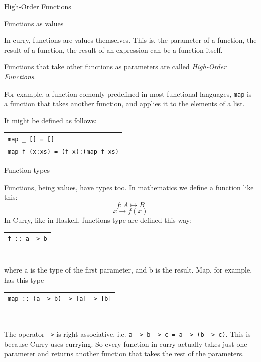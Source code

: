 \documentclass{beamer}
\newcommand{\q}[1]{\texttt{#1}}
\begin{document}
\begin{section}{High-Order Functions}
    \begin{subsection}{Functions as values}
      \begin{frame}
        In curry, functions are values themselves. This is, the parameter of a
        function, the result of a function, the result of an expression can be a
        function itself.
    
        Functions that take other functions as parameters are called
        \textit{High-Order Functions}.

        For example, a function comonly predefined in most functional languages,
        \q{map} is a function that takes another function, and applies it to the
        elements of a list.

        It might be defined as follows:
        \begin{tabular}[c]{l}
        \\
        \q{map \_ [] = []}\\
        \q{map f (x:xs) = (f x):(map f xs)}\\
        
        \end{tabular}
      \end{frame}
     \end{subsection}
     \begin{subsection}{Function types}
     \begin{frame}
        Functions, being values, have types too. In mathematics we define a
        function like this:
        $$ f : A \mapsto B$$
        $$ x \rightarrow f(x)$$
        In Curry, like in Haskell, functions type are defined this way:
        \begin{tabular}[c]{l}
         \\
         \q{f :: a -> b}\\
         \\
         
        \end{tabular}\\
        where a is the type of the first parameter, and b is the result.
        Map, for example, has this type
        \begin{tabular}[c]{l}
         \\
         \q{map :: (a -> b) -> [a] -> [b]}\\
         
        \end{tabular}\\
      \end{frame}
      \begin{frame}
        The operator \q{->}  is right associative, i.e. \q{a -> b -> c = a -> (b
        -> c)}. This is because Curry uses currying. So every function in curry
        actually takes just one parameter and returns another function that
        takes the rest of the parameters.


\end{frame}
\end{subsection}
\end{section}
\end{document}
